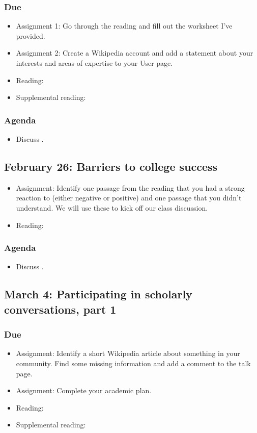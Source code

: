 \documentclass[12pt,article,oneside]{memoir}
\begin{document}
\subsubsection{Due}
\begin{itemize}
 \item Assignment 1: Go through the reading and fill out the worksheet I've provided.
 \item Assignment 2: Create a Wikipedia account and add a statement about your interests and areas of expertise to your User page.
 \item Reading: \cite{guillory2008s}
 \item Supplemental reading: \cite{rosenberg}
\end{itemize}

\subsubsection{Agenda}
\begin{itemize}
\item Discuss \cite{guillory2008s}.
\end{itemize}


\subsection{February 26: Barriers to college success}
\begin{itemize}
 \item Assignment: Identify one passage from the reading that you had a strong reaction to (either negative or positive) and one passage that you didn't understand.  We will use these to kick off our class discussion.
 \item Reading: \cite{guillory2008s}
\end{itemize}

\subsubsection{Agenda}
\begin{itemize}
\item Discuss \cite{guillory2008s}.
\end{itemize}



\subsection{March 4: Participating in scholarly conversations, part 1}
\subsubsection{Due}
\begin{itemize}
 \item Assignment: Identify a short Wikipedia article about something in your community.  Find some missing information and add a comment to the talk page.
 \item Assignment: Complete your academic plan.
 \item Reading: \cite{eval}
 \item Supplemental reading: \cite{training}
\end{itemize}
\end{document}
